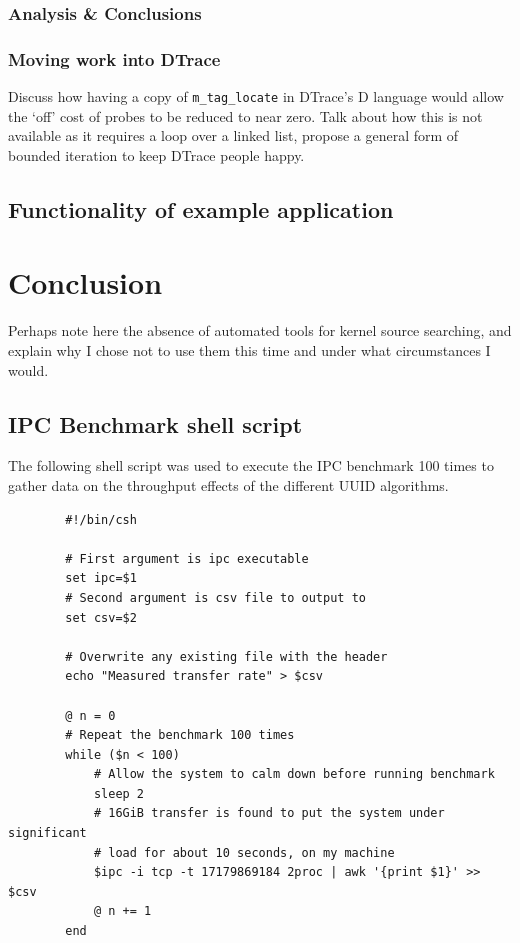 \documentclass[a4paper,12pt,twoside,openright]{report}
\begin{document}
	\subsection{Analysis \& Conclusions}
	
	\subsection{Moving work into DTrace}
	
	Discuss how having a copy of \verb|m_tag_locate| in DTrace's D language would allow the `off' cost of probes to be reduced to near zero. Talk about how this is not available as it requires a loop over a linked list, propose a general form of bounded iteration to keep DTrace people happy.
	
	\section{Functionality of example application}
	
	\chapter{Conclusion}
	
	Perhaps note here the absence of automated tools for kernel source searching, and explain why I chose not to use them this time and under what circumstances I would.
	
	
	
	
	\begin{appendices}
		\chapter{IPC Benchmark shell script}
		\label{appendix:IPC}
		
		The following shell script was used to execute the IPC benchmark 100 times to gather data on the throughput effects of the different UUID algorithms.
		
		\begin{verbatim}
		#!/bin/csh
		
		# First argument is ipc executable
		set ipc=$1
		# Second argument is csv file to output to
		set csv=$2
		
		# Overwrite any existing file with the header
		echo "Measured transfer rate" > $csv
		
		@ n = 0
		# Repeat the benchmark 100 times
		while ($n < 100)
		    # Allow the system to calm down before running benchmark
		    sleep 2
		    # 16GiB transfer is found to put the system under significant
		    # load for about 10 seconds, on my machine
		    $ipc -i tcp -t 17179869184 2proc | awk '{print $1}' >> $csv
		    @ n += 1
		end
		\end{verbatim}
	\end{appendices}
	
	
	
	
	
	
\end{document}
